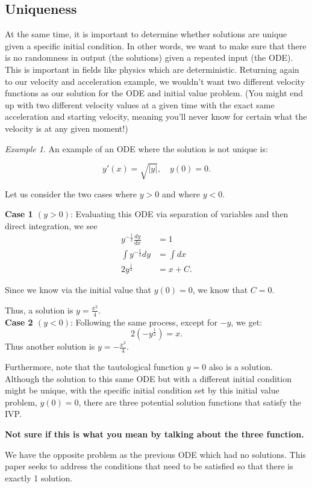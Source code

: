 \documentclass{article}
\theoremstyle{remark}
\newtheorem{example}{Example}
\begin{document}
\subsection{Uniqueness}
At the same time, it is important to determine whether solutions are unique given a specific initial condition. In other words, we want to make sure that there is no randomness in output (the solutions) given a repeated input (the ODE). This is important in fields like physics which are deterministic. Returning again to our velocity and acceleration example, we wouldn't want two different velocity functions as our solution for the ODE and initial value problem. (You might end up with two different velocity values at a given time with the exact same acceleration and starting velocity, meaning you'll never know for certain what the  velocity is at any given moment!) \\

\begin{example} An example of an ODE where the solution is not unique is:

$$y'(x) = \sqrt{|y|}, \quad y(0) = 0.$$


Let us consider the two cases where $y>0$ and where $y<0$.

\textbf{Case 1 $(y>0)$}:
Evaluating this ODE via separation of variables and then direct integration, we see
\begin{align*}
y^{-\frac{1}{2}}\frac{dy}{dx} &= 1 \\
\int y^{-\frac{1}{2}}dy &= \int dx \\
2y^{\frac{1}{2}} &= x +C.
\end{align*}

Since we know via the initial value that $y(0) = 0$, we know that $C = 0$.

Thus, a solution is $y = \frac{x^2}{4}$.\\


\textbf{Case 2 $(y<0)$}:
Following the same process, except for $-y$, we get:
$$ 2(-y^{\frac{1}{2}}) = x.$$
Thus another solution is $y = -\frac{x^2}{4}$.




Furthermore, note that the tautological function $y = 0$ also is a solution. Although the solution to this same ODE but with a different initial condition might be unique, with the specific initial condition set by this initial value problem, $y(0) = 0$, there are three potential solution functions that satisfy the IVP.

\textbf{Not sure if this is what you mean by talking about the three function.}

We have the opposite problem as the previous ODE which had no solutions. This paper seeks to address the conditions that need to be satisfied so that there is exactly 1 solution.

\end{example}
\end{document}
